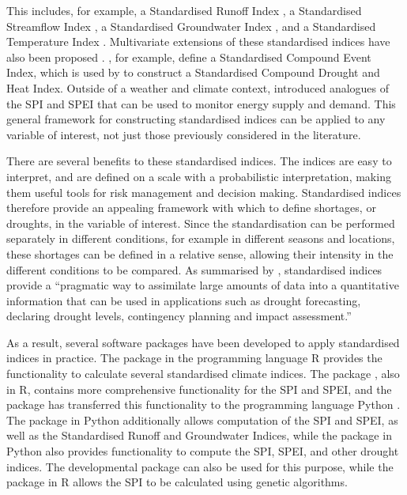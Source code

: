 This includes, for example, a Standardised Runoff Index \citep{ShuklaWood2008}, a Standardised Streamflow Index \citep{VicenteEtAl2012}, a Standardised Groundwater Index \citep{BloomfieldMarchant2013}, and a Standardised Temperature Index \citep{ZscheischlerEtAl2014}. Multivariate extensions of these standardised indices have also been proposed \citep{ErhardtCzado2018}. \cite{HaoEtAl2019}, for example, define a Standardised Compound Event Index, which is used by \cite{LiEtAl2021} to construct a Standardised Compound Drought and Heat Index. Outside of a weather and climate context, \cite{AllenOtero2023} introduced analogues of the SPI and SPEI that can be used to monitor energy supply and demand. This general framework for constructing standardised indices can be applied to any variable of interest, not just those previously considered in the literature.

There are several benefits to these standardised indices. The indices are easy to interpret, and are defined on a scale with a probabilistic interpretation, making them useful tools for risk management and decision making. Standardised indices therefore provide an appealing framework with which to define shortages, or droughts, in the variable of interest. Since the standardisation can be performed separately in different conditions, for example in different seasons and locations, these shortages can be defined in a relative sense, allowing their intensity in the different conditions to be compared. As summarised by \cite{ZargarEtAl2011}, standardised indices provide a ``pragmatic way to assimilate large amounts of data into a quantitative information that can be used in applications such as drought forecasting, declaring
drought levels, contingency planning and impact assessment.''

As a result, several software packages have been developed to apply standardised indices in practice. The  package \citep{SCI} in the programming language R provides the functionality to calculate several standardised climate indices. The  package \citep{SPEI-R}, also in R, contains more comprehensive functionality for the SPI and SPEI, and the  package \citep{standard-precip} has transferred this functionality to the programming language Python \citep{Python}. The  package \citep{spei-python} in Python additionally allows computation of the SPI and SPEI, as well as the Standardised Runoff and Groundwater Indices, while the  package in Python also provides functionality to compute the SPI, SPEI, and other drought indices. The developmental package  \citep{standaRdized} can also be used for this purpose, while the  package \citep{SPIGA} in R allows the SPI to be calculated using genetic algorithms.

